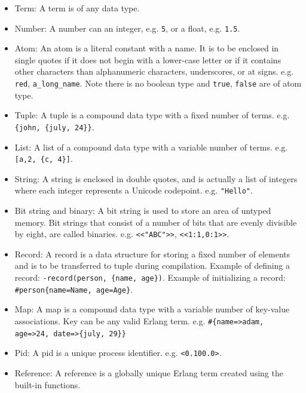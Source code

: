 \begin{itemize}
\item Term: A term is of any data type.
\item Number: A number can an integer, e.g. \verb|5|, or a float, e.g. \verb|1.5|.
\item Atom: An atom is a literal constant with a name. It is to be enclosed in single quotes if it does not begin with a lower-case letter or if it contains other characters than alphanumeric characters, underscores, or at signs. e.g. \verb|red|, \verb|a_long_name|. Note there is no boolean type and \verb|true|, \verb|false| are of atom type.
\item Tuple: A tuple is a compound data type with a fixed number of terms. e.g. \verb|{john, {july, 24}}|.
\item List: A list of a compound data type with a variable number of terms. e.g. \verb|[a,2, {c, 4}]|.
\item String: A string is enclosed in double quotes, and is actually a list of integers where each integer represents a Unicode codepoint. e.g. \verb|"Hello"|.
\item Bit string and binary: A bit string is used to store an area of untyped memory. Bit strings that consist of a number of bits that are evenly divisible by eight, are called binaries. e.g. \verb|<<"ABC">>|, \verb|<<1:1,0:1>>|.
\item Record: A record is a data structure for storing a fixed number of elements and is to be transferred to tuple during compilation. Example of defining a record: \verb|-record(person, {name, age})|. Example of initializing a record: 
\verb|#person{name=Name, age=Age}|.
\item Map: A map is a compound data type with a variable number of key-value associations. Key can be any valid Erlang term. e.g. \verb|#{name=>adam, age=>24, date=>{july, 29}}|
\item Pid: A pid is a unique process identifier. e.g. \verb|<0.100.0>|.
\item Reference: A reference is a globally unique Erlang term created using the built-in functions.
\end{itemize}


